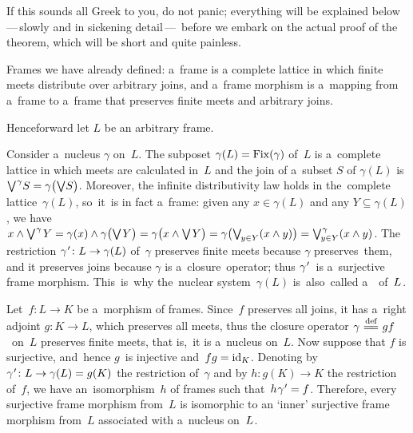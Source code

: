 \documentclass[11pt,letterpaper]{article}
\renewcommand{\thmskip}{\bigskip}
\begin{document}
\thmskip

If this sounds all Greek to you, do not panic; %
everything will be explained below\,---\,slowly and in sickening detail\,---\,%
before we embark on the actual proof of the theorem,
which will be short and quite painless.

\txtskip

Frames we have already defined:
a~frame is a complete lattice in which finite meets distribute over arbitrary joins,
and a~frame morphism is a~mapping from a~frame to a~frame
that preserves finite meets and arbitrary joins.

\txtskip

Henceforward let $L$ be an arbitrary frame.

\txtskip

Consider a~nucleus $\gamma$ on~$L$.
The subposet $\gamma(L) = \mathop{\smash{\mathrm{Fix}}}\nolimits(\gamma)$ of~$L$ is a~complete lattice
in which meets are calculated in~$L$
and the join of a~subset $S$ of $\gamma(L)$ is
$\Join^{\tinysp\gamma}\!S =\nolinebreak \gamma\bigl(\Join\!S\bigr)$.
Moreover, the infinite distributivity law holds in the~complete lattice~$\gamma(L)$,
so~it~is in fact a~frame:
given any $x\in \gamma(L)$ and any $Y\subseteq\gamma(L)$, we have
$x\meet\Join^{\tinysp\gamma}\negtinysp Y
    = \gamma(x)\meet\gamma\bigl(\Join\negtinysp Y\bigr)
    = \gamma\bigl(x\meet\Join\negtinysp Y\bigr)
    = \gamma\bigl(\Join_{\negdtinysp y\in Y}(x\meet\nolinebreak y)\bigr)
    = \Join^{\tinysp\gamma}_{\negdtinysp y\in Y}(x\meet y)$.
The restriction $\gamma^{\mspace{1mu}\prime}\colon L\to\gamma(L)$ of~$\gamma$
preserves finite meets because $\gamma$ preserves~them,
and it preserves joins because $\gamma$ is a~closure~operator;
thus $\gamma^{\mspace{1mu}\prime}$~is a~surjective frame morphism.
This~is~why the~nuclear system~$\gamma(L)$
	is~also~called a~~of~$L\mspace{1mu}$.

Let~$f\colon L\to K$ be a~morphism of frames.
Since~$f$ preserves all joins,
it has a~right adjoint $g\colon K\to L$, which preserves all meets,
thus the closure operator $\gamma \mathrel{\overset{\text{def}}{\mspace{1mu}=\!=\mspace{1mu}}} gf$~on~$L$ preserves finite meets,
that is,~it is a~nucleus on~$L$.
Now suppose that $f$ is surjective,
	and~hence $g$~is injective and~$fg=\mathrm{id}_K$.
Denoting by~$\gamma^{\mspace{1mu}\prime}\colon L\to\gamma(L)=g(K)$ the restriction of~$\gamma$
and by $h\colon g(K)\to K$ the restriction of~$f$,
we have an~isomorphism~$h$ of frames such that~$h\mspace{1mu}\gamma^{\mspace{1mu}\prime} = f$.
Therefore, every surjective frame morphism from~$L$ is isomorphic
to an `inner' surjective frame morphism from~$L$ associated with a~nucleus on~$L\mspace{1mu}$.
\end{document}
